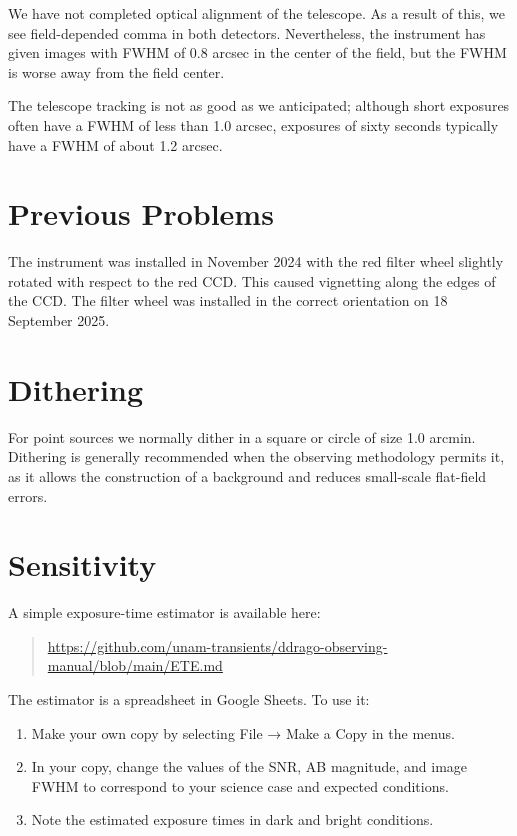 We have not completed optical alignment of the telescope. As a result of this, we see field-depended comma in both detectors. Nevertheless, the instrument has given images with FWHM of 0.8 arcsec in the center of the field, but the FWHM is worse away from the field center.

The telescope tracking is not as good as we anticipated; although short exposures often have a FWHM of less than 1.0 arcsec, exposures of sixty seconds typically have a FWHM of about 1.2 arcsec.

\section{Previous Problems}


The instrument was installed in November 2024 with the red filter wheel slightly rotated with respect to the red CCD. This caused vignetting along the edges of the CCD. The filter wheel was installed in the correct orientation on 18 September 2025.

\section{Dithering}

For point sources we normally dither in a square or circle of size 1.0 arcmin.
Dithering is generally recommended when the observing methodology permits it, as it allows the construction of a background and reduces small-scale flat-field errors.

\section{Sensitivity}

A simple exposure-time estimator is available here:

\begin{quote}
    \url{https://github.com/unam-transients/ddrago-observing-manual/blob/main/ETE.md}
\end{quote}

The estimator is a spreadsheet in Google Sheets. To use it:
\begin{enumerate}
    \item
        Make your own copy by selecting File → Make a Copy in the menus.
    \item
        In your copy, change the values of the SNR, AB magnitude, and image FWHM to correspond to your science case and expected conditions.
    \item
        Note the estimated exposure times in dark and bright conditions.
\end{enumerate}

